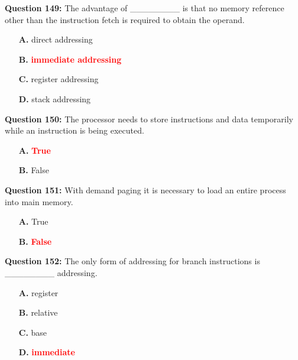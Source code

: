 \documentclass[12pt,a4paper]{article}
\begin{document}
\vspace{0.5cm}

\textbf{Question 149:} The advantage of ________ is that no memory reference other than the instruction fetch is required to obtain the operand.

\begin{itemize}
    \item[\textbf{A.}] direct addressing
    \item[\textbf{B.}] \textcolor{red}{\textbf{immediate addressing}}
    \item[\textbf{C.}] register addressing
    \item[\textbf{D.}] stack addressing
\end{itemize}

\vspace{0.5cm}

\textbf{Question 150:} The processor needs to store instructions and data temporarily while an instruction is being executed.

\begin{itemize}
    \item[\textbf{A.}] \textcolor{red}{\textbf{True}}
    \item[\textbf{B.}] False
\end{itemize}

\vspace{0.5cm}

\textbf{Question 151:} With demand paging it is necessary to load an entire process into main memory.

\begin{itemize}
    \item[\textbf{A.}] True
    \item[\textbf{B.}] \textcolor{red}{\textbf{False}}
\end{itemize}

\vspace{0.5cm}

\textbf{Question 152:} The only form of addressing for branch instructions is ________ addressing.

\begin{itemize}
    \item[\textbf{A.}] register
    \item[\textbf{B.}] relative
    \item[\textbf{C.}] base
    \item[\textbf{D.}] \textcolor{red}{\textbf{immediate}}
\end{itemize}
\end{document}
